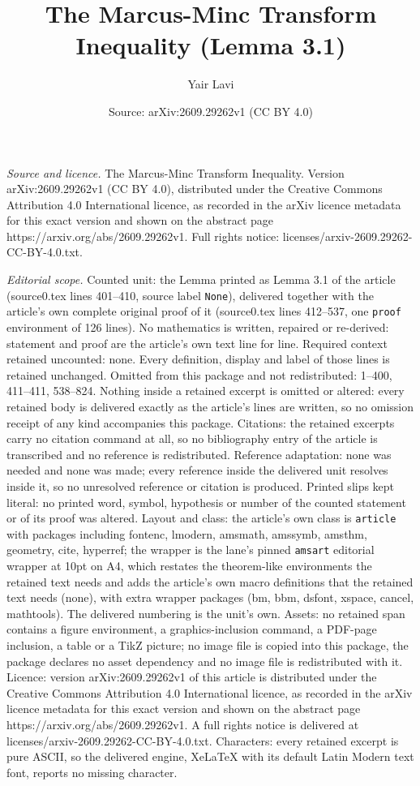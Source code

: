 \documentclass[10pt,a4paper]{amsart}
\title[The Marcus-Minc Transform Inequality]{The Marcus-Minc Transform Inequality (Lemma 3.1)}
\author{Yair Lavi}
\date{Source: arXiv:2609.29262v1 (CC BY 4.0)}
\begin{document}
\maketitle

\noindent\emph{Source and licence.} The Marcus-Minc Transform Inequality. Version arXiv:2609.29262v1 (CC BY 4.0), distributed under the Creative Commons Attribution 4.0 International licence, as recorded in the arXiv licence metadata for this exact version and shown on the abstract page https://arxiv.org/abs/2609.29262v1. Full rights notice: licenses/arxiv-2609.29262-CC-BY-4.0.txt.\par\smallskip

\noindent\textit{Editorial scope.} Counted unit: the Lemma printed as Lemma 3.1 of the article (source0.tex lines 401--410, source label \texttt{None}), delivered together with the article's own complete original proof of it (source0.tex lines 412--537, one \texttt{proof} environment of 126 lines). No mathematics is written, repaired or re-derived: statement and proof are the article's own text line for line. Required context retained uncounted: none. Every definition, display and label of those lines is retained unchanged. Omitted from this package and not redistributed: 1--400, 411--411, 538--824. Nothing inside a retained excerpt is omitted or altered: every retained body is delivered exactly as the article's lines are written, so no omission receipt of any kind accompanies this package. Citations: the retained excerpts carry no citation command at all, so no bibliography entry of the article is transcribed and no reference is redistributed. Reference adaptation: none was needed and none was made; every reference inside the delivered unit resolves inside it, so no unresolved reference or citation is produced. Printed slips kept literal: no printed word, symbol, hypothesis or number of the counted statement or of its proof was altered. Layout and class: the article's own class is \texttt{article} with packages including fontenc, lmodern, amsmath, amssymb, amsthm, geometry, cite, hyperref; the wrapper is the lane's pinned \texttt{amsart} editorial wrapper at 10pt on A4, which restates the theorem-like environments the retained text needs and adds the article's own macro definitions that the retained text needs (none), with extra wrapper packages (bm, bbm, dsfont, xspace, cancel, mathtools). The delivered numbering is the unit's own. Assets: no retained span contains a figure environment, a graphics-inclusion command, a PDF-page inclusion, a table or a TikZ picture; no image file is copied into this package, the package declares no asset dependency and no image file is redistributed with it. Licence: version arXiv:2609.29262v1 of this article is distributed under the Creative Commons Attribution 4.0 International licence, as recorded in the arXiv licence metadata for this exact version and shown on the abstract page https://arxiv.org/abs/2609.29262v1. A full rights notice is delivered at licenses/arxiv-2609.29262-CC-BY-4.0.txt. Characters: every retained excerpt is pure ASCII, so the delivered engine, XeLaTeX with its default Latin Modern text font, reports no missing character.
\end{document}
